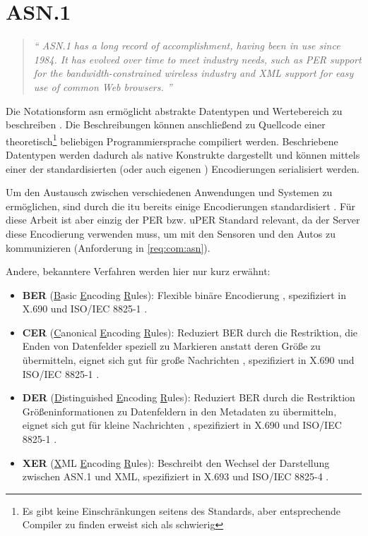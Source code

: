 
\section{ASN.1}

\begin{quotation}
	\textit{\enquote{
			ASN.1 has a long record of accomplishment, having been in use since 1984. It has evolved over time to meet industry needs, such as PER support for the bandwidth-constrained wireless industry and XML support for easy use of common Web browsers.
		}}
	\cite{asn:itu:asn.1}
\end{quotation}

Die Notationsform \gls{asn} ermöglicht abstrakte Datentypen und Wertebereich zu beschreiben \cite{asn:layman}.
Die Beschreibungen können anschließend zu Quellcode einer theoretisch\footnote{Es gibt keine Einschränkungen seitens des Standards, aber entsprechende Compiler zu finden erweist sich als schwierig } beliebigen Programmiersprache compiliert werden.
Beschriebene Datentypen werden dadurch als native Konstrukte dargestellt und können mittels einer der standardisierten (oder auch eigenen \cite{asn:itu:ecn}) Encodierungen serialisiert werden.

Um den Austausch zwischen verschiedenen Anwendungen und Systemen zu ermöglichen, sind durch die \gls{itu}  bereits einige Encodierungen standardisiert \cite[8]{asn:itu:x691}.
Für diese Arbeit ist aber einzig der PER bzw. uPER Standard relevant, da der Server diese Encodierung verwenden muss, um mit den Sensoren und den Autos zu kommunizieren (Anforderung in \autoref{req:com:asn}).

Andere, bekanntere Verfahren werden hier nur kurz erwähnt:
\begin{itemize}
	\item \textbf{BER} (\underline{B}asic \underline{E}ncoding \underline{R}ules): Flexible binäre Encodierung \cite{asn:wiki:x690}, spezifiziert in X.690 \cite{asn:itu:x690} und ISO/IEC 8825-1 \cite{asn:iso}.
	\item \textbf{CER} (\underline{C}anonical \underline{E}ncoding \underline{R}ules): Reduziert BER durch die Restriktion, die Enden von Datenfelder speziell zu Markieren anstatt deren Größe zu übermitteln, eignet sich gut für große Nachrichten \cite{asn:wiki:x690}, spezifiziert in X.690 \cite{asn:itu:x690} und ISO/IEC 8825-1 \cite{asn:iso}.
	\item \textbf{DER} (\underline{D}istinguished \underline{E}ncoding \underline{R}ules): Reduziert BER durch die Restriktion Größeninformationen zu Datenfeldern in den Metadaten zu übermitteln, eignet sich gut für kleine Nachrichten \cite{asn:wiki:x690}, spezifiziert in X.690 \cite{asn:itu:x690} und ISO/IEC 8825-1 \cite{asn:iso}.
	\item \textbf{XER} (\underline{X}ML \underline{E}ncoding \underline{R}ules): Beschreibt den Wechsel der Darstellung zwischen ASN.1 und XML, spezifiziert in X.693 \cite{asn:itu:x693} und ISO/IEC 8825-4 \cite{asn:iso}.
\end{itemize}

